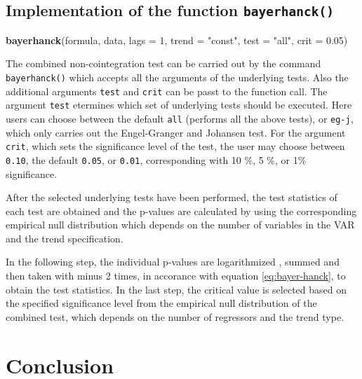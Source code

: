 \documentclass[11.5pt,a4paper]{article}
\newenvironment{Shaded}{\begin{snugshade}}{\end{snugshade}}
\newcommand{\DataTypeTok}[1]{\textcolor[rgb]{0.13,0.29,0.53}{#1}}
\newcommand{\DecValTok}[1]{\textcolor[rgb]{0.00,0.00,0.81}{#1}}
\newcommand{\FloatTok}[1]{\textcolor[rgb]{0.00,0.00,0.81}{#1}}
\newcommand{\KeywordTok}[1]{\textcolor[rgb]{0.13,0.29,0.53}{\textbf{#1}}}
\newcommand{\NormalTok}[1]{#1}
\newcommand{\StringTok}[1]{\textcolor[rgb]{0.31,0.60,0.02}{#1}}
\begin{document}
\hypertarget{implementation-of-the-function-bayerhanck}{%
\subsection{\texorpdfstring{Implementation of the function
\texttt{bayerhanck()}}{Implementation of the function bayerhanck()}}\label{implementation-of-the-function-bayerhanck}}

\begin{Shaded}
\begin{Highlighting}[]
\KeywordTok{bayerhanck}\NormalTok{(formula, data, }\DataTypeTok{lags =} \DecValTok{1}\NormalTok{, }\DataTypeTok{trend =} \StringTok{"const"}\NormalTok{, }
           \DataTypeTok{test =} \StringTok{"all"}\NormalTok{, }\DataTypeTok{crit =} \FloatTok{0.05}\NormalTok{)}
\end{Highlighting}
\end{Shaded}

The combined non-cointegration test can be carried out by the command
\texttt{bayerhanck()} which accepts all the arguments of the underlying
tests. Also the additional arguments \texttt{test} and \texttt{crit} can
be passt to the function call. The argument \texttt{test} etermines
which set of underlying tests should be executed. Here users can choose
between the default \texttt{all} (performs all the above tests), or
\texttt{eg-j}, which only carries out the Engel-Granger and Johansen
test. For the argument \texttt{crit}, which sets the significance level
of the test, the user may choose between \texttt{0.10}, the default
\texttt{0.05}, or \texttt{0.01}, corresponding with 10 \%, 5 \%, or 1\%
significance.

After the selected underlying tests have been performed, the test
statistics of each test are obtained and the p-values are calculated by
using the corresponding empirical null distribution which depends on the
number of variables in the VAR and the trend specification.

In the following step, the individual p-values are logarithmized ,
summed and then taken with minus 2 times, in accorance with equation
\eqref{eq:bayer-hanck}, to obtain the test statistics. In the last step,
the critical value is selected based on the specified significance level
from the empirical null distribution of the combined test, which depends
on the number of regressors and the trend type.

\hypertarget{conclusion}{%
\section{Conclusion}\label{conclusion}}
\end{document}

